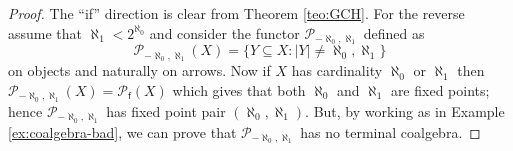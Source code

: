 \documentclass[letterpaper, 11pt, oneside]{memoir}
\theoremstyle{myteo}
\numberwithin{equation}{section}
\begin{document}
\begin{proof}
  The ``if'' direction is clear from Theorem \ref{teo:GCH}.
  For the reverse assume that \(\aleph_1 < 2^{\aleph_0}\) and consider the functor \(\mathcal{P}_{-\aleph_0,\aleph_1}\) defined as
  \begin{equation*}
    \mathcal{P}_{-\aleph_0, \aleph_1}(X) = \{Y \subseteq X : |Y| \neq \aleph_0, \aleph_1\}
  \end{equation*}
  on objects and naturally on arrows.
  Now if \(X\) has cardinality \(\aleph_0\) or \(\aleph_1\) then \(\mathcal{P}_{-\aleph_0, \aleph_1}(X) = \mathcal{P}_{\textsf{f}}(X)\) which gives that both \(\aleph_0\) and \(\aleph_1\) are fixed points; hence \(\mathcal{P}_{-\aleph_0, \aleph_1}\) has fixed point pair \((\aleph_0, \aleph_1)\).
  But, by working as in Example \ref{ex:coalgebra-bad}, we can prove that \(\mathcal{P}_{-\aleph_0, \aleph_1}\) has no terminal coalgebra.
\end{proof}

\printbibliography
\end{document}
